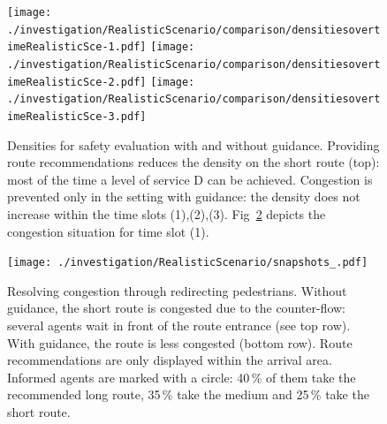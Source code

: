 \begin{figure}[H]
\texttt{[image: ./investigation/RealisticScenario/comparison/densitiesovertimeRealisticSce-1.pdf]} 
\texttt{[image: ./investigation/RealisticScenario/comparison/densitiesovertimeRealisticSce-2.pdf]} 
\texttt{[image: ./investigation/RealisticScenario/comparison/densitiesovertimeRealisticSce-3.pdf]} 
\caption[Densities for safety evaluation]{Densities for safety evaluation with and without guidance. Providing route recommendations reduces the density on the short route (top): most of the time a  level of service D can be achieved. Congestion is prevented only in the setting with guidance: the density does not increase within the time slots (1),(2),(3). Fig~\ref{fig:snapshotsrealisticusecase} depicts the congestion situation for time slot (1). }
\label{fig:densitiesrealisticusecase}
\end{figure}



\begin{figure}[H]
\texttt{[image: ./investigation/RealisticScenario/snapshots\_.pdf]} 
\caption[Resolving congestion through redirecting pedestrians]{Resolving congestion through redirecting pedestrians.
Without guidance, the short route is congested due to the counter-flow: several agents wait in front of the route entrance (see top row). With guidance, the route is less congested (bottom row).  Route recommendations are only displayed within the arrival area. Informed agents are marked with a circle: 40\,\% of them take the recommended long route, 35\,\% take the medium and 25\,\% take the short route.}
\label{fig:snapshotsrealisticusecase}
\end{figure}









